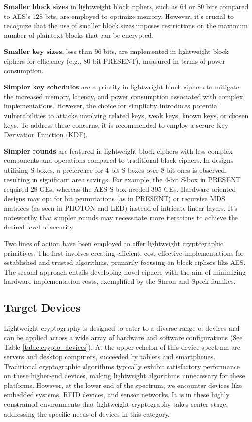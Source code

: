 \documentclass[conference,compsoc]{IEEEtran}
\begin{document}
\textbf{Smaller block sizes} in lightweight block ciphers, such as 64 or 80 bits compared to AES's 128 bits, are employed to optimize memory. However, it's crucial to recognize that the use of smaller block sizes imposes restrictions on the maximum number of plaintext blocks that can be encrypted. 

\textbf{Smaller key sizes}, less than 96 bits, are implemented in lightweight block ciphers for efficiency (e.g., 80-bit PRESENT), measured in terms of power consumption.

\textbf{Simpler key schedules} are a priority in lightweight block ciphers to mitigate the increased memory, latency, and power consumption associated with complex implementations. However, the choice for simplicity introduces potential vulnerabilities to attacks involving related keys, weak keys, known keys, or chosen keys. To address these concerns, it is recommended to employ a secure Key Derivation Function (KDF).

\textbf{Simpler rounds} are featured in lightweight block ciphers with less complex components and operations compared to traditional block ciphers. In designs utilizing S-boxes, a preference for 4-bit S-boxes over 8-bit ones is observed, resulting in significant area savings. For example, the 4-bit S-box in PRESENT required 28 GEs, whereas the AES S-box needed 395 GEs. Hardware-oriented designs may opt for bit permutations (as in PRESENT) or recursive MDS matrices (as seen in PHOTON and LED) instead of intricate linear layers. It's noteworthy that simpler rounds may necessitate more iterations to achieve the desired level of security.

Two lines of action have been employed to offer lightweight cryptographic primitives. The first involves creating efficient, cost-effective implementations for established and trusted algorithms, primarily focusing on block ciphers like AES. The second approach entails developing novel ciphers with the aim of minimizing hardware implementation costs, exemplified by the Simon and Speck families.
\subsection{Target Devices}
Lightweight cryptography is designed to cater to a diverse range of devices and can be applied across a wide array of hardware and software configurations (See Table \ref{table:crypto_devices}). At the upper echelon of this device spectrum are servers and desktop computers, succeeded by tablets and smartphones. Traditional cryptographic algorithms typically exhibit satisfactory performance on these higher-end devices, making lightweight algorithms unnecessary for these platforms. However, at the lower end of the spectrum, we encounter devices like embedded systems, RFID devices, and sensor networks. It is in these highly constrained environments that lightweight cryptography takes center stage, addressing the specific needs of devices in this category.
\end{document}
